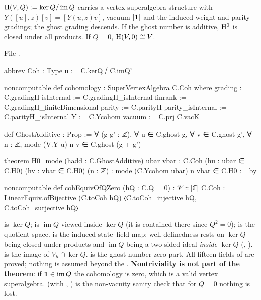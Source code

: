 \begin{theorem}\label{l04:thm:brst}
$\mathrm{H}(V,Q) := \ker Q/\operatorname{im}Q$ carries a vertex superalgebra structure with
$Y([u],z)[v] = [Y(u,z)v]$, vacuum $[\mathbf{1}]$ and the induced weight and parity gradings; the ghost
grading descends. If the ghost number is additive, $\mathrm{H}^0$ is closed under all products. If $Q = 0$,
$\mathrm{H}(V,0)\cong V$.
\end{theorem}
\noindent File .
\begin{leancode}
abbrev Coh : Type u := C.kerQ ⧸ C.imQ'

noncomputable def cohomology : SuperVertexAlgebra C.Coh where
  grading := C.gradingH
  isInternal := C.gradingH_isInternal
  finrank := C.gradingH_finiteDimensional
  parity := C.parityH
  parity_isInternal := C.parityH_isInternal
  Y := C.Ycohom
  vacuum := C.prj C.vacK

def GhostAdditive : Prop :=
  ∀ (g g' : ℤ), ∀ u ∈ C.ghost g, ∀ v ∈ C.ghost g', ∀ n : ℤ,
    mode (V.Y u) n v ∈ C.ghost (g + g')

theorem H0_mode (hadd : C.GhostAdditive) {ubar vbar : C.Coh}
    (hu : ubar ∈ C.H0) (hv : vbar ∈ C.H0) (n : ℤ) :
    mode (C.Ycohom ubar) n vbar ∈ C.H0 := by

noncomputable def cohEquivOfQZero (hQ : C.Q = 0) : 𝒱 ≃ₗ[ℂ] C.Coh :=
  LinearEquiv.ofBijective (C.toCoh hQ) ⟨C.toCoh_injective hQ, C.toCoh_surjective hQ⟩
\end{leancode}
\begin{dictionary}
 is $\ker Q$;  is $\operatorname{im}Q$ viewed inside $\ker Q$ (it is contained
there since $Q^2 = 0$);  is the quotient space.  is the induced state--field
map; well-definedness rests on $\ker Q$ being closed under products and $\operatorname{im}Q$ being a
two-sided ideal \emph{inside} $\ker Q$ (\allowbreak{}\allowbreak{}\allowbreak{}, \allowbreak{}\allowbreak{}\allowbreak{}).
 is the image of $V_h\cap\ker Q$.  is the ghost-number-zero part. All fifteen
fields of  are proved; nothing is assumed beyond the .
\textbf{Nontriviality is not part of the theorem}: if $\mathbf{1}\in\operatorname{im}Q$ the cohomology is
zero, which is a valid vertex superalgebra.  (with ,
) is the non-vacuity sanity check that for $Q = 0$ nothing is lost.
\end{dictionary}
